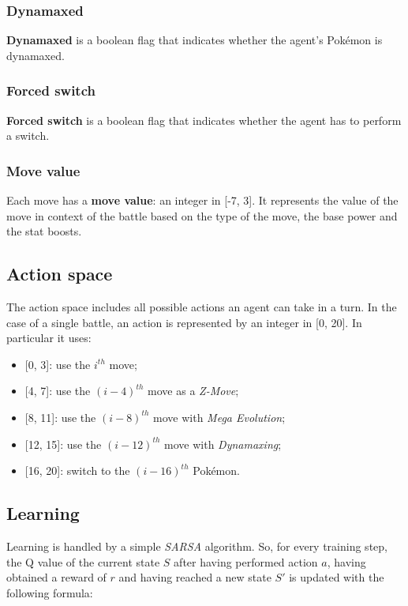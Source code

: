 \documentclass{article}
\begin{document}
\subsubsection{Dynamaxed}

\textbf{Dynamaxed} is a boolean flag that indicates whether the agent's Pokémon is dynamaxed.

\subsubsection{Forced switch}

\textbf{Forced switch} is a boolean flag that indicates whether the agent has to perform a switch.

\subsubsection{Move value}

Each move has a \textbf{move value}: an integer in [-7, 3].
It represents the value of the move in context of the battle based on the type of the move, the base power and the stat boosts.

\subsection{Action space} \label{action_space}

The action space includes all possible actions an agent can take in a turn.
In the case of a single battle, an action is represented by an integer in [0, 20].
In particular it uses:
\begin{itemize}
    \item {[0, 3]}: use the $i^{th}$ move;
    \item {[4, 7]}: use the $(i - 4)^{th}$ move as a \textit{Z-Move};
    \item {[8, 11]}: use the $(i - 8)^{th}$ move with \textit{Mega Evolution};
    \item {[12, 15]}: use the $(i - 12)^{th}$ move with \textit{Dynamaxing};
    \item {[16, 20]}: switch to the $(i - 16)^{th}$ Pokémon.
\end{itemize}

\subsection{Learning} \label{Sarsa_eq}

Learning is handled by a simple \textit{SARSA} algorithm.
So, for every training step, the Q value of the current state $S$ after having performed action $a$, having obtained a reward of $r$ and having reached a new state $S'$ is updated with the following formula:
\end{document}
